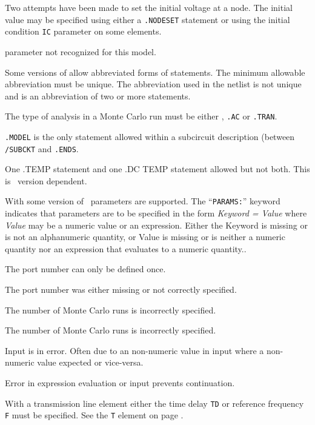 Two attempts have been made to set the initial voltage at a node.
The initial value may be specified using either a {\tt .NODESET}
statement or using the initial condition {\tt IC} parameter on some elements.

parameter not recognized for this model.

Some versions of \spice allow abbreviated forms of statements.  The minimum
allowable abbreviation must be unique.  The abbreviation used in the netlist
is not unique and is an abbreviation of two or more statements.

The type of analysis in a Monte Carlo run must be either
, {\tt .AC} or {\tt .TRAN}.

{\tt .MODEL} is the only statement allowed within a
subcircuit description (between {\tt /SUBCKT} and {\tt .ENDS}.

One .TEMP statement and one .DC TEMP statement allowed but not both.
This is \justspice\ version dependent.

With some version of \spice\ parameters are supported.
The ``{\tt PARAMS:}'' keyword indicates that parameters are to be specified in the
form {\it Keyword = Value} where {\it Value} may be a numeric value or an
expression.  Either the Keyword is missing or is not an alphanumeric quantity,
or Value is missing or is neither a numeric quantity nor an expression that
evaluates to a numeric quantity..

The port number can only be defined once.

The port number was either missing or not correctly specified.

The number of Monte Carlo runs is incorrectly specified.

The number of Monte Carlo runs is incorrectly specified.

Input is in error. Often due to an  non-numeric value in input where a
non-numeric value expected or vice-versa.

Error in expression evaluation or input prevents continuation.

With a transmission line element either the time delay {\tt TD}
or reference frequency {\tt F} must be specified.  See the
{\tt T} element on page \pageref{Telement}.

